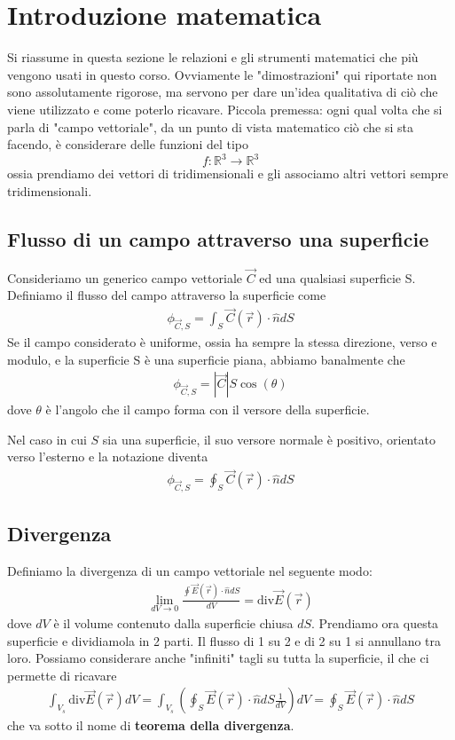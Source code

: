 \documentclass{book}
\begin{document}
\tableofcontents

\newpage




\chapter{Introduzione matematica}
Si riassume in questa sezione le relazioni e gli strumenti matematici che più vengono usati in questo corso. Ovviamente le "dimostrazioni" qui riportate non sono assolutamente rigorose, ma servono per dare un'idea qualitativa di ciò che viene utilizzato e come poterlo ricavare. 
Piccola premessa: ogni qual volta che si parla di "campo vettoriale", da un punto di vista matematico ciò che si sta facendo, è considerare delle funzioni del tipo 
\[
    f: \mathbb{R}^3 \to \mathbb{R}^3
\]
ossia prendiamo dei vettori di tridimensionali e gli associamo altri vettori sempre tridimensionali.

\section{Flusso di un campo attraverso una superficie}
Consideriamo un generico campo vettoriale $\vec{C}$ ed una qualsiasi superficie S. Definiamo il flusso del campo attraverso la superficie come 
\begin{align*}
    \phi_{\vec{C}, S} = \int_S \vec{C}(\vec{r}) \cdot \hat{n} dS
\end{align*}
Se il campo considerato è uniforme, ossia ha sempre la stessa direzione, verso e modulo, e la superficie S è una superficie piana, abbiamo banalmente che
\begin{align*}
    \phi _{\vec{C}, S} = |\vec{C}| S \cos(\theta)
\end{align*}
dove $\theta$ è l'angolo che il campo forma con il versore della superficie. 

\noindent Nel caso in cui $S$ sia una superficie, il suo versore normale è positivo, orientato verso l'esterno e la notazione diventa
\begin{align*}
    \phi_{\vec{C}, S}= \oint_S \vec{C} (\vec{r})\cdot \hat{n}dS 
\end{align*}


\section{Divergenza}
Definiamo la divergenza di un campo vettoriale nel seguente modo:
\begin{align*}
    \lim_{dV\to 0} \frac{\oint \vec{E}(\vec{r})\cdot \hat{n}dS}{dV} = \text{div} \vec{E}(\vec{r})
\end{align*}
dove $dV$ è il volume contenuto dalla superficie chiusa $dS$.
Prendiamo ora questa superficie e dividiamola in 2 parti. Il flusso di 1 su 2 e di 2 su 1 si annullano tra loro.
Possiamo considerare anche "infiniti" tagli su tutta la superficie, il che ci permette di ricavare 
\begin{align*}
    \int_{V_s} \text{div}\vec{E}(\vec{r}) dV = \int _{V_s} \left(\oint _S\vec{E}(\vec{r})\cdot \hat{n}dS \frac{1}{dV}\right) dV = \oint _S\vec{E}(\vec{r})\cdot \hat{n}dS
\end{align*}
che va sotto il nome di \textbf{teorema della divergenza}.
\end{document}
